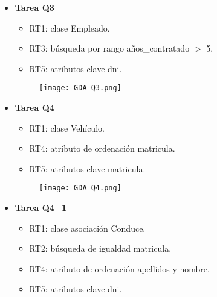 \documentclass[a4paper]{article}
\begin{document}
\begin{itemize}
    \item \textbf{\large{Tarea Q3}}

    \begin{itemize}

        \item RT1: clase Empleado.

        \item RT3: búsqueda por rango años\_contratado $>$ 5.

        \item RT5: atributos clave dni.

    \end{itemize}

    \begin{figure}[H]
        \centering
        \texttt{[image: GDA\_Q3.png]}
        \label{fig:Q3}
    \end{figure}

\newpage

    \item \textbf{\large{Tarea Q4}}

    \begin{itemize}

        \item RT1: clase Vehículo.

        \item RT4: atributo de ordenación matricula.

        \item RT5: atributos clave matricula.

    \end{itemize}

    \begin{figure}[H]
        \centering
        \texttt{[image: GDA\_Q4.png]}
        \label{fig:Q4}
    \end{figure}

    \item \textbf{\large{Tarea Q4\_1}}

    \begin{itemize}

        \item RT1: clase asociación Conduce.

        \item RT2: búsqueda de igualdad matricula.

        \item RT4: atributo de ordenación apellidos y nombre.

        \item RT5: atributos clave dni.


\end{itemize}
\end{itemize}
\end{document}
